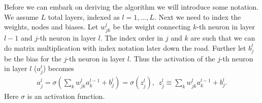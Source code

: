 \documentclass[12pt]{extarticle}
\begin{document}
Before we can embark on deriving the algorithm we will introduce some notation. We assume $L$ total layers, indexed as $l = 1, \dots , L$. Next we need to index the weights, nodes and biases. Let $w_{jk}^l$ be the weight connecting $k$-th neuron in layer $l-1$ and $j$-th neuron in layer $l$. The index order in $j$ and $k$ are such that we can do matrix multiplication with index notation later down the road. Further let $b_j^l$ be the bias for the $j$-th neuron in layer $l$. Thus the activation of the $j$-th neuron in layer $l$ ($a^l_j$) becomes
\begin{align}
	a_j^l = \sigma\left(\sum_{k} w_{jk}^l a_k^{l-1} + b_j^l\right) = \sigma(z_j^l), \ \ z_j^l \equiv \sum_{k} w_{jk}^l a_k^{l-1} + b_j^l.
	\label{eq:activation_of_node_ajl}
\end{align}
Here $\sigma$ is an activation function.
\end{document}
